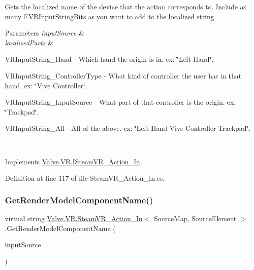 Gets the localized name of the device that the action corresponds to. Include as many E\+V\+R\+Input\+String\+Bits as you want to add to the localized string 


\begin{DoxyParams}{Parameters}
{\em input\+Source} & \\
\hline
{\em localized\+Parts} & 
\begin{DoxyItemize}
\item V\+R\+Input\+String\+\_\+\+Hand -\/ Which hand the origin is in. ex\+: \char`\"{}\+Left Hand\char`\"{}.  
\item V\+R\+Input\+String\+\_\+\+Controller\+Type -\/ What kind of controller the user has in that hand. ex\+: \char`\"{}\+Vive Controller\char`\"{}.  
\item V\+R\+Input\+String\+\_\+\+Input\+Source -\/ What part of that controller is the origin. ex\+: \char`\"{}\+Trackpad\char`\"{}.  
\item V\+R\+Input\+String\+\_\+\+All -\/ All of the above. ex\+: \char`\"{}\+Left Hand Vive Controller Trackpad\char`\"{}.  
\end{DoxyItemize}\\
\hline
\end{DoxyParams}


Implements \mbox{\hyperlink{interface_valve_1_1_v_r_1_1_i_steam_v_r___action___in_aa4ff7b17b61ea2e9ab5fe8421ed5e877}{Valve.\+V\+R.\+I\+Steam\+V\+R\+\_\+\+Action\+\_\+\+In}}.



Definition at line 117 of file Steam\+V\+R\+\_\+\+Action\+\_\+\+In.\+cs.

\mbox{\label{class_valve_1_1_v_r_1_1_steam_v_r___action___in_ad435fe38eac2d62d6ce217644a6586af}} 
\subsubsection{\texorpdfstring{GetRenderModelComponentName()}{GetRenderModelComponentName()}}
{\footnotesize\ttfamily virtual string \mbox{\hyperlink{class_valve_1_1_v_r_1_1_steam_v_r___action___in}{Valve.\+V\+R.\+Steam\+V\+R\+\_\+\+Action\+\_\+\+In}}$<$ Source\+Map, Source\+Element $>$.Get\+Render\+Model\+Component\+Name (\begin{DoxyParamCaption}\item[{\mbox{\hyperlink{namespace_valve_1_1_v_r_a82e5bf501cc3aa155444ee3f0662853f}{Steam\+V\+R\+\_\+\+Input\+\_\+\+Sources}}}]{input\+Source }\end{DoxyParamCaption})\hspace{0.3cm}{\ttfamily [virtual]}}



